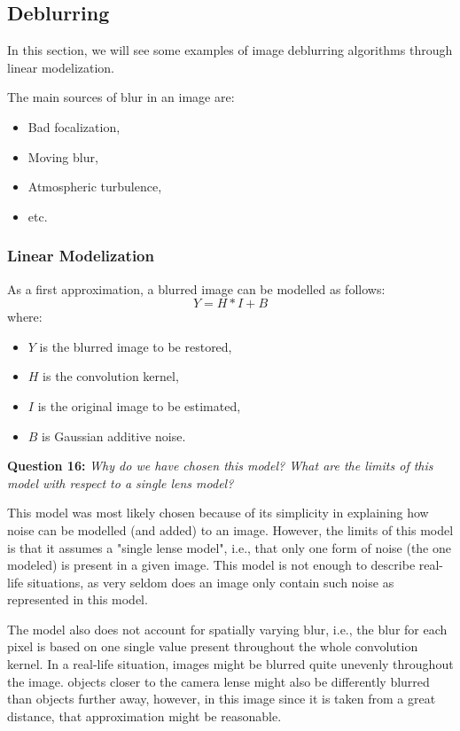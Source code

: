 \subsection{Deblurring}
In this section, we will see some examples of image deblurring algorithms through linear modelization.

The main sources of blur in an image are:
\begin{itemize}
    \item Bad focalization,
    \item Moving blur,
    \item Atmospheric turbulence,
    \item etc.
\end{itemize}

\subsubsection{Linear Modelization}

As a first approximation, a blurred image can be modelled as follows:
\begin{equation}
    Y = H * I + B
\end{equation}
where:
\begin{itemize}
    \item $Y$ is the blurred image to be restored,
    \item $H$ is the convolution kernel,
    \item $I$ is the original image to be estimated,
    \item $B$ is Gaussian additive noise.
\end{itemize}

\textbf{Question 16:}
\textit{Why do we have chosen this model? What are the limits of this model with respect to a single lens model?}

This model was most likely chosen because of its simplicity in explaining how noise can be modelled (and added) to an image. However, the limits of this model is that it assumes a "single lense model", i.e., that only one form of noise (the one modeled) is present in a given image. This model is not enough to describe real-life situations, as very seldom does an image only contain such noise as represented in this model. 

The model also does not account for spatially varying blur, i.e., the blur for each pixel is based on one single value present throughout the whole convolution kernel. In a real-life situation, images might be blurred quite unevenly throughout the image. objects closer to the camera lense might also be differently blurred than objects further away, however, in this image since it is taken from a great distance, that approximation might be reasonable.

